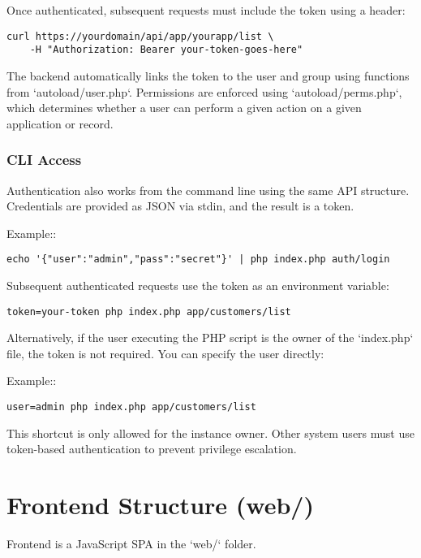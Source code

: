 \documentclass[a4paper]{article}
\begin{document}
Once authenticated, subsequent requests must include the token using a header:

\begin{lstlisting}
curl https://yourdomain/api/app/yourapp/list \
    -H "Authorization: Bearer your-token-goes-here"
\end{lstlisting}

The backend automatically links the token to the user and group using functions from `autoload/user.php`. Permissions are enforced using `autoload/perms.php`, which determines whether a user can perform a given action on a given application or record.

\hypertarget{toc17}{}
\subsubsection{CLI Access}

Authentication also works from the command line using the same API structure. Credentials are provided as JSON via stdin, and the result is a token.

Example::

\begin{lstlisting}
echo '{"user":"admin","pass":"secret"}' | php index.php auth/login
\end{lstlisting}

Subsequent authenticated requests use the token as an environment variable:

\begin{lstlisting}
token=your-token php index.php app/customers/list
\end{lstlisting}

Alternatively, if the user executing the PHP script is the owner of the `index.php` file, the token is not required. You can specify the user directly:

Example::

\begin{lstlisting}
user=admin php index.php app/customers/list
\end{lstlisting}

This shortcut is only allowed for the instance owner. Other system users must use token-based authentication to prevent privilege escalation.


\hypertarget{toc18}{}
\section{Frontend Structure (web/)}

Frontend is a JavaScript SPA in the `web/` folder.
\end{document}
